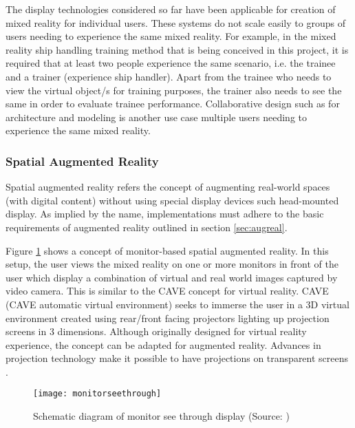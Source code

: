 The display technologies considered so far have been applicable for creation of mixed reality for individual users. These systems do not scale easily to groups of users needing to experience the same mixed reality. For example, in the mixed reality ship handling training method that is being conceived in this project, it is required that at least two people experience the same scenario, i.e. the trainee and a trainer (experience ship handler). Apart from the trainee who needs to view the virtual object/s for training purposes, the trainer also needs to see the same in order to evaluate trainee performance. Collaborative design such as for architecture and modeling is another use case multiple users needing to experience the same mixed reality. 

\subsubsection{Spatial Augmented Reality}

Spatial augmented reality refers the concept of augmenting real-world spaces (with digital content) without using special display devices such head-mounted display. As implied by the name, implementations must adhere to the basic requirements of augmented reality outlined in section \ref{sec:augreal}. 


Figure \ref{fig:monitorseethrough} shows a concept of monitor-based spatial augmented reality. In this setup, the user views the mixed reality on one or more monitors in front of the user which display a combination of virtual and real world images captured by video camera. This is similar to the CAVE \cite{cruz1993surround} concept for virtual reality. CAVE (CAVE automatic virtual environment) seeks to immerse the user in a 3D virtual environment created using rear/front facing projectors lighting up projection screens in 3 dimensions. Although originally designed for virtual reality  experience, the concept can be adapted for augmented reality. Advances in projection technology make it possible to have projections on transparent screens \cite{peterson2006human}. 

\begin{figure}
	\centering
	\texttt{[image: monitorseethrough]}
	\caption{Schematic diagram of monitor see through display (Source: \cite{azuma1997survey})}
	\label{fig:monitorseethrough}
\end{figure}


